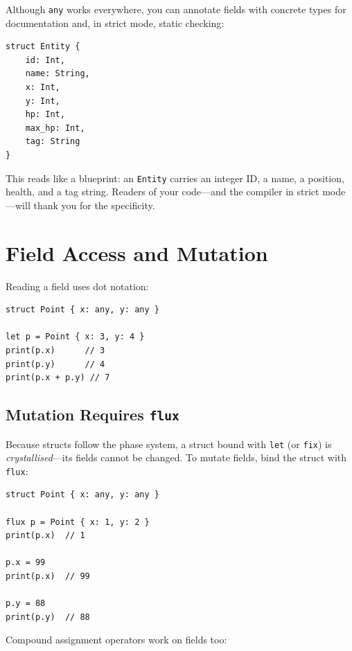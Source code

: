 Although \lstinline|any| works everywhere, you can annotate fields with
concrete types for documentation and, in strict mode, static checking:

\begin{lstlisting}[language=Lattice, caption={Typed struct fields}]
struct Entity {
    id: Int,
    name: String,
    x: Int,
    y: Int,
    hp: Int,
    max_hp: Int,
    tag: String
}
\end{lstlisting}

This reads like a blueprint: an \lstinline|Entity| carries an integer ID, a
name, a position, health, and a tag string. Readers of your code---and the
compiler in strict mode---will thank you for the specificity.

\section{Field Access and Mutation}\label{sec:struct-fields}

Reading a field uses dot notation:

\begin{lstlisting}[language=Lattice, caption={Field access}]
struct Point { x: any, y: any }

let p = Point { x: 3, y: 4 }
print(p.x)      // 3
print(p.y)      // 4
print(p.x + p.y) // 7
\end{lstlisting}

\subsection{Mutation Requires \texttt{flux}}

Because structs follow the phase system, a struct bound with \lstinline|let|
(or \lstinline|fix|) is \emph{crystallised}---its fields cannot be changed.
To mutate fields, bind the struct with \lstinline|flux|:

\begin{lstlisting}[language=Lattice, caption={Mutating struct fields}]
struct Point { x: any, y: any }

flux p = Point { x: 1, y: 2 }
print(p.x)  // 1

p.x = 99
print(p.x)  // 99

p.y = 88
print(p.y)  // 88
\end{lstlisting}

Compound assignment operators work on fields too:

